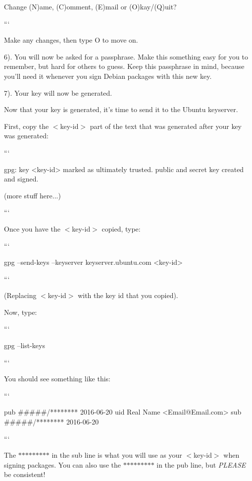 Change (N)ame, (C)omment, (E)mail or (O)kay/(Q)uit?

```

Make any changes, then type {\ttfamily O} to move on.

6). You will now be asked for a passphrase. Make this something easy for you to remember, but hard for others to guess. Keep this passphrase in mind, because you'll need it whenever you sign Debian packages with this new key.

7). Your key will now be generated.

Now that your key is generated, it's time to send it to the Ubuntu keyserver.

First, copy the {\ttfamily $<$key-\/id$>$} part of the text that was generated after your key was generated\-:

``` \begin{DoxyVerb}gpg: key <key-id> marked as ultimately trusted.
public and secret key created and signed. 

(more stuff here...)
\end{DoxyVerb}


```

Once you have the {\ttfamily $<$key-\/id$>$} copied, type\-:

``` \begin{DoxyVerb}gpg --send-keys --keyserver keyserver.ubuntu.com <key-id>
\end{DoxyVerb}


```

(Replacing {\ttfamily $<$key-\/id$>$} with the key id that you copied).

Now, type\-:

``` \begin{DoxyVerb}gpg --list-keys
\end{DoxyVerb}


```

You should see something like this\-:

``` \begin{DoxyVerb}pub   #####/******** 2016-06-20
uid                  Real Name <Email@Email.com>
sub   #####/******** 2016-06-20
\end{DoxyVerb}


```

The {\ttfamily $\ast$$\ast$$\ast$$\ast$$\ast$$\ast$$\ast$$\ast$$\ast$} in the {\ttfamily sub} line is what you will use as your {\ttfamily $<$key-\/id$>$} when signing packages. You can also use the {\ttfamily $\ast$$\ast$$\ast$$\ast$$\ast$$\ast$$\ast$$\ast$$\ast$} in the {\ttfamily pub} line, but {\itshape P\-L\-E\-A\-S\-E} be consistent!

